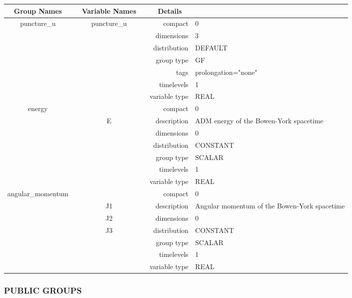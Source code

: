 \vspace{5mm}

\begin{tabular*}{150mm}{|c|c@{\extracolsep{\fill}}|rl|} \hline 
~ {\bf Group Names} ~ & ~ {\bf Variable Names} ~  &{\bf Details} ~ & ~\\ 
\hline 
puncture\_u & puncture\_u & compact & 0 \\ 
 &  & dimensions & 3 \\ 
 &  & distribution & DEFAULT \\ 
 &  & group type & GF \\ 
 &  & tags & prolongation="none" \\ 
 &  & timelevels & 1 \\ 
 &  & variable type & REAL \\ 
\hline 
energy &  & compact & 0 \\ 
 & E & description & ADM energy of the Bowen-York spacetime \\ 
 &  & dimensions & 0 \\ 
 &  & distribution & CONSTANT \\ 
 &  & group type & SCALAR \\ 
 &  & timelevels & 1 \\ 
 &  & variable type & REAL \\ 
\hline 
angular\_momentum &  & compact & 0 \\ 
 & J1 & description & Angular momentum of the Bowen-York spacetime \\ 
 & J2 & dimensions & 0 \\ 
 & J3 & distribution & CONSTANT \\ 
 &  & group type & SCALAR \\ 
 &  & timelevels & 1 \\ 
 &  & variable type & REAL \\ 
\hline 
\end{tabular*} 


\vspace{5mm}\subsubsection{PUBLIC GROUPS}

\vspace{5mm}

